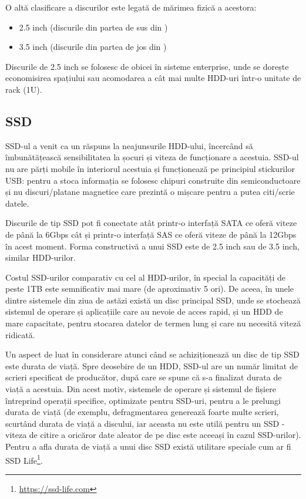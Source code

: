
O altă clasificare a discurilor este legată de mărimea fizică a acestora:

\begin{itemize}
  \item 2.5 inch (discurile din partea de sus din )
  \item 3.5 inch (discurile din partea de jos din )
\end{itemize}

Discurile de 2.5 inch se folosesc de obicei în sisteme enterprise, unde se
dorește economisirea spațiului sau acomodarea a cât mai multe HDD-uri într-o
unitate de rack (1U).

\subsection{SSD}
\label{sec:storage:type:ssd}

SSD-ul a venit ca un răspuns la neajunsurile HDD-ului, încercând să
îmbunătățească sensibilitatea la șocuri și viteza de funcționare a
acestuia. SSD-ul nu are părți mobile în interiorul acestuia și funcționează pe
principiul stickurilor USB: pentru a stoca informația se folosesc chipuri
construite din semiconductoare și nu discuri/platane magnetice care prezintă o
mișcare pentru a putea citi/scrie datele.

Discurile de tip SSD pot fi conectate atât printr-o interfață SATA ce oferă
viteze de până la 6Gbps cât și printr-o interfață SAS ce oferă viteze de până la
12Gbps în acest moment. Forma constructivă a unui SSD este de 2.5 inch sau
de 3.5 inch, similar HDD-urilor.

Costul SSD-urilor comparativ cu cel al HDD-urilor, în special la capacități de
peste 1TB este semnificativ mai mare (de aproximativ 5 ori). De aceea, în
unele dintre sistemele din ziua de astăzi există un disc principal SSD, unde se stochează
sistemul de operare și aplicațiile care au nevoie de acces rapid, și un
HDD de mare capacitate, pentru stocarea datelor de termen lung și care nu
necesită viteză ridicată.

Un aspect de luat în considerare atunci când se achiziționează un disc de tip SSD
este durata de viață. Spre deosebire de un HDD, SSD-ul are un număr limitat de
scrieri specificat de producător, după care se spune că s-a finalizat durata de
viață a acestuia. Din acest motiv, sistemele de operare și sistemul de fișiere
întreprind operații specifice, optimizate pentru SSD-uri, pentru a
le prelungi durata de viață (de exemplu, defragmentarea generează foarte multe
scrieri, scurtând durata de viață a discului, iar aceasta nu este utilă pentru
un SSD - viteza de citire a oricăror date aleator de pe disc este aceeași în
cazul SSD-urilor). Pentru a afla durata de viață a unui disc SSD există utilitare
speciale cum ar fi SSD Life\footnote{\url{https://ssd-life.com}}.

